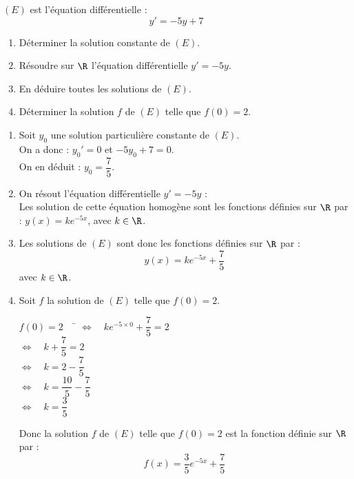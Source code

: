 \documentclass[a4paper,11pt,exos]{nsi}
\begin{document}
\maketitle



\exo{}
$(E)$ est l'équation différentielle  : 
$$y'=-5y+7$$
\begin{enumerate}
    \item Déterminer la solution constante de $(E)$.
    \item Résoudre sur $\R$ l'équation différentielle $y'=-5y$.
    \item En déduire toutes les solutions de $(E)$.
    \item Déterminer la solution $f$ de $(E)$ telle que $f(0)=2$.
\end{enumerate}

\textcolor{UGLiBlue}{
    \begin{enumerate}
        \item Soit $y_0$ une solution particulière constante de $(E)$.\\
        On a donc : $y_0' = 0$ et $-5y_0 + 7 = 0$.\\
        On en déduit : $y_0 = \dfrac{7}{5}$.
        \item On résout l'équation différentielle $y'=-5y$ :\\
        Les solution de cette équation homogène sont les fonctions définies sur $\R$ par : $y(x) = ke^{-5x}$, avec $k \in \R$.\\
        \item Les solutions de $(E)$ sont donc les fonctions définies sur $\R$ par :
        $$y(x) = ke^{-5x} + \frac{7}{5}$$
        avec $k \in \R$.
        \item Soit $f$ la solution de $(E)$ telle que $f(0)=2$.
        \begin{tabbing}
            $f(0)=2 \quad$ \= $\iff\quad ke^{-5 \times 0} + \dfrac{7}{5} = 2$\\
            \> $\iff\quad k + \dfrac{7}{5} = 2$\\
            \> $\iff\quad k = 2 - \dfrac{7}{5}$\\
            \> $\iff\quad k = \dfrac{10}{5} - \dfrac{7}{5}$\\
            \> $\iff\quad k = \dfrac{3}{5}$
        \end{tabbing}
        Donc la solution $f$ de $(E)$ telle que $f(0)=2$ est la fonction définie sur $\R$ par :
        $$f(x) = \dfrac{3}{5}e^{-5x} + \dfrac{7}{5}$$
    \end{enumerate}
}
\end{document}
